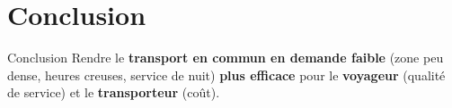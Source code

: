 \documentclass[table]{beamer}
\begin{document}
\section{Conclusion}

\begin{frame}{Conclusion}
  Rendre le \textbf{transport en commun en demande faible} (zone peu
  dense, heures creuses, service de nuit) \textbf{plus efficace} pour
  le \textbf{voyageur} (qualité de service) et le
  \textbf{transporteur} (coût).
\end{frame}

\begin{frame}
  \titlepage
\end{frame}
\end{document}
